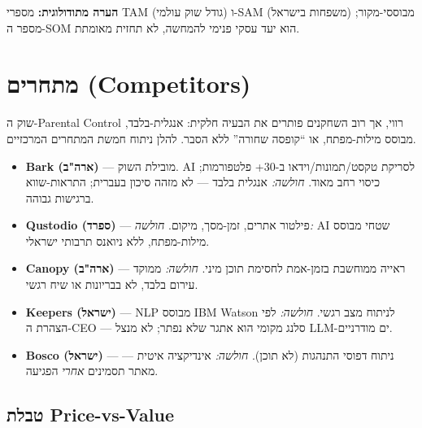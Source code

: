 \documentclass[11pt]{article}
\newcommand{\en}[1]{\textenglish{#1}}
\begin{document}
\textbf{הערה מתודולוגית:} מספרי \en{TAM} (גודל שוק עולמי) ו-\en{SAM} (משפחות בישראל) מבוססי-מקור; מספר ה-\en{SOM} הוא יעד עסקי פנימי להמחשה, לא תחזית מאומתת.

\section{מתחרים (\en{Competitors})}

שוק ה-\en{Parental Control} רווי, אך רוב השחקנים פותרים את הבעיה חלקית: אנגלית-בלבד, מבוסס מילות-מפתח, או ``קופסה שחורה'' ללא הסבר. להלן ניתוח חמשת המתחרים המרכזיים.

\begin{itemize}[leftmargin=*]
  \item \textbf{\en{Bark} (ארה"ב)} — מובילת השוק. \en{AI} לסריקת טקסט/תמונות/וידאו ב-\en{30+} פלטפורמות; כיסוי רחב מאוד. \textit{חולשה:} אנגלית בלבד — לא מזהה סיכון בעברית; התראות-שווא ברגישות גבוהה.
  \item \textbf{\en{Qustodio} (ספרד)} — פילטור אתרים, זמן-מסך, מיקום. \textit{חולשה:} \en{AI} שטחי מבוסס מילות-מפתח, ללא ניואנס תרבותי ישראלי.
  \item \textbf{\en{Canopy} (ארה"ב)} — ראייה ממוחשבת בזמן-אמת לחסימת תוכן מיני. \textit{חולשה:} ממוקד עירום בלבד, לא בבריונות או שיח רגשי.
  \item \textbf{\en{Keepers} (ישראל)} — \en{NLP} מבוסס \en{IBM Watson} לניתוח מצב רגשי. \textit{חולשה:} לפי הצהרת ה-\en{CEO} — סלנג מקומי הוא אתגר שלא נפתר; לא מנצל \en{LLM}-ים מודרניים.
  \item \textbf{\en{Bosco} (ישראל)} — ניתוח דפוסי התנהגות (לא תוכן). \textit{חולשה:} אינדיקציה איטית — מאתר תסמינים \textit{אחרי} הפגיעה.
\end{itemize}

\subsection*{טבלת \en{Price-vs-Value}}
\end{document}
